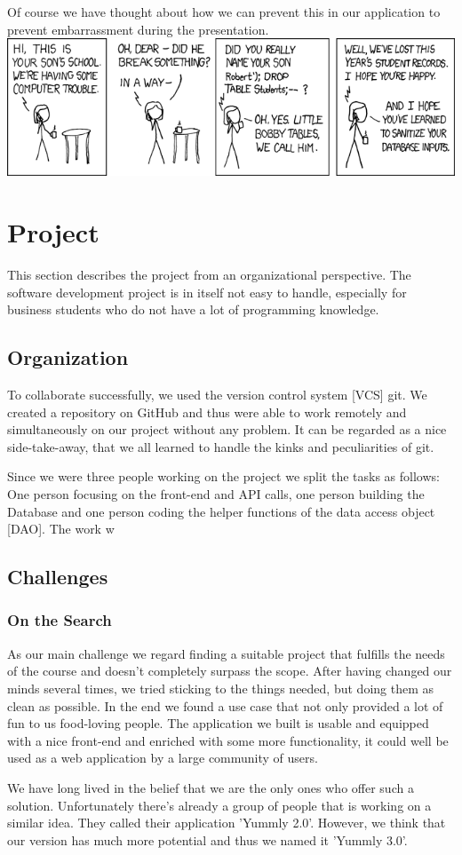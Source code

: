 \documentclass[11pt,a4paper,notitlepage]{article}
\begin{document}
Of course we have thought about how we can prevent this in our application to prevent embarrassment during the presentation.
\includegraphics[scale = .5]{exploits_of_a_mom.png}


\section*{Project}
This section describes the project from an organizational perspective. The software development project is in itself not easy to handle, especially for business students who do not have a lot of programming knowledge. 
\subsection*{Organization}
To collaborate successfully, we used the version control system [VCS] git. We created a repository on GitHub and thus were able to work remotely and simultaneously on our project without any problem. It can be regarded as a nice side-take-away, that we all learned to handle the kinks and peculiarities of git. \par Since we were three people working on the project we split the tasks as follows: One person focusing on the front-end and API calls, one person building the Database and one person coding the helper functions of the data access object [DAO]. The work w

\subsection*{Challenges}
\subsubsection*{On the Search}
As our main challenge we regard finding a suitable project that fulfills the needs of the course and doesn't completely surpass the scope. After having changed our minds several times, we tried sticking to the things needed, but doing them as clean as possible. In the end we found a use case that not only provided a lot of fun to us food-loving people. The application we built is usable and equipped with a nice front-end and enriched with some more functionality, it could well be used as a web application by a large community of users. \par We have long lived in the belief that we are the only ones who offer such a solution. Unfortunately there's already a group of people that is working on a similar idea. They called their application 'Yummly 2.0'. However, we think that our version has much more potential and thus we named it 'Yummly 3.0'.
\end{document}
